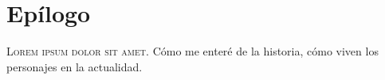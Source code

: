 

\chapter{Epílogo}
\lettrine{L}{orem ipsum dolor sit amet}. Cómo me enteré de la historia, cómo viven los personajes en la actualidad.